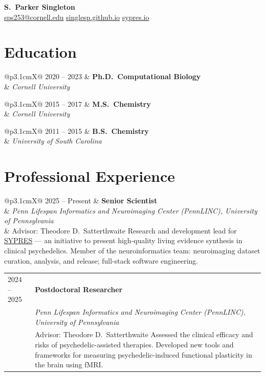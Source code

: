 \documentclass[11pt, letterpaper]{article}
\makeatletter
\newcommand{\entry}[4]{%
  \noindent
  \begin{tabularx}{\linewidth}{@{}p{3.1cm}X@{}}
    \textcolor{light}{\small #1} &
    \textbf{#2} \\
    & \textit{#3} \\
    & #4
  \end{tabularx}
  \vspace{0.4em}
}
\newcommand{\entryshort}[3]{%
  \noindent
  \begin{tabularx}{\linewidth}{@{}p{3.1cm}X@{}}
    \textcolor{light}{\small #1} &
    \textbf{#2} \\
    & \textit{#3}
  \end{tabularx}
  \vspace{0.3em}
}
\makeatother
\begin{document}
\thispagestyle{fancy}

\begin{center}
  {\Huge\sffamily\bfseries\color{accent} S.\ Parker Singleton}\\[0.5em]
  {\small
    \href{mailto:sps253@cornell.edu}{sps253@cornell.edu}
    \enspace\textbullet\enspace
    \href{https://singlesp.github.io}{singlesp.github.io}
    \enspace\textbullet\enspace
    \href{https://sypres.io}{sypres.io}
  }
\end{center}

\vspace{0.5em}

\section{Education}

\entryshort{2020 -- 2023}{Ph.D.\ Computational Biology}{Cornell University}

\entryshort{2015 -- 2017}{M.S.\ Chemistry}{Cornell University}

\entryshort{2011 -- 2015}{B.S.\ Chemistry}{University of South Carolina}

\section{Professional Experience}

\entry{2025 -- Present}
  {Senior Scientist}
  {Penn Lifespan Informatics and Neuroimaging Center (PennLINC), University of Pennsylvania}
  {Advisor: Theodore D.\ Satterthwaite \newline
   Research and development lead for \href{https://sypres.io}{SYPRES} --- an initiative to present high-quality living evidence synthesis in clinical psychedelics. \newline
   Member of the neuroinformatics team: neuroimaging dataset curation, analysis, and release; full-stack software engineering.}

\entry{2024 -- 2025}
  {Postdoctoral Researcher}
  {Penn Lifespan Informatics and Neuroimaging Center (PennLINC), University of Pennsylvania}
  {Advisor: Theodore D.\ Satterthwaite \newline
   Assessed the clinical efficacy and risks of psychedelic-assisted therapies. \newline
   Developed new tools and frameworks for measuring psychedelic-induced functional plasticity in the brain using fMRI.}
\end{document}
